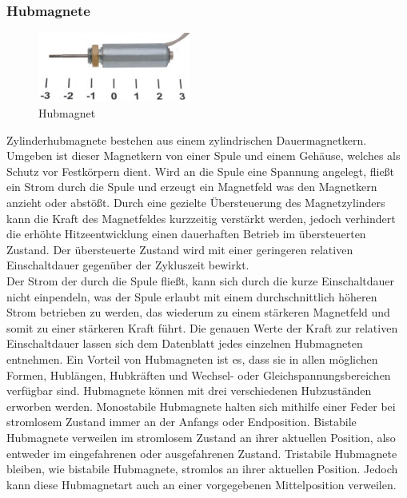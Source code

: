\subsubsection{Hubmagnete}
\begin{figure}[H] 
\begin{center}

\includegraphics[width=5cm]{Bilder/Bauteile/Hubmagnet}
\caption{Hubmagnet}
\label{Hubmagnet}

\end{center}
\end{figure}
Zylinderhubmagnete bestehen aus einem zylindrischen Dauermagnetkern. Umgeben ist dieser Magnetkern von einer Spule und einem Gehäuse, welches als Schutz vor Festkörpern dient. Wird an die Spule eine Spannung angelegt, fließt ein Strom durch die Spule und erzeugt ein Magnetfeld was den Magnetkern anzieht oder abstößt. Durch eine gezielte Übersteuerung des Magnetzylinders kann die Kraft des Magnetfeldes kurzzeitig verstärkt werden, jedoch verhindert die erhöhte Hitzeentwicklung einen dauerhaften Betrieb im übersteuerten Zustand. Der übersteuerte Zustand wird mit einer geringeren relativen Einschaltdauer gegenüber der Zykluszeit bewirkt. \\Der Strom der durch die Spule fließt, kann sich durch die kurze Einschaltdauer nicht einpendeln, was der Spule erlaubt mit einem durchschnittlich höheren Strom betrieben zu werden, das wiederum zu einem stärkeren Magnetfeld und somit zu einer stärkeren Kraft führt. Die genauen Werte der Kraft zur relativen Einschaltdauer lassen sich dem Datenblatt jedes einzelnen Hubmagneten entnehmen. Ein Vorteil von Hubmagneten ist es, dass sie in allen möglichen Formen, Hublängen, Hubkräften und Wechsel- oder Gleichspannungsbereichen verfügbar sind. Hubmagnete können mit drei verschiedenen Hubzuständen erworben werden. Monostabile Hubmagnete halten sich mithilfe einer Feder bei stromlosem Zustand immer an der Anfangs oder Endposition. Bistabile Hubmagnete verweilen im stromlosem Zustand an ihrer aktuellen Position, also entweder im eingefahrenen oder ausgefahrenen Zustand. Tristabile Hubmagnete bleiben, wie bistabile Hubmagnete, stromlos an ihrer aktuellen Position. Jedoch kann diese Hubmagnetart auch an einer vorgegebenen Mittelposition verweilen.

